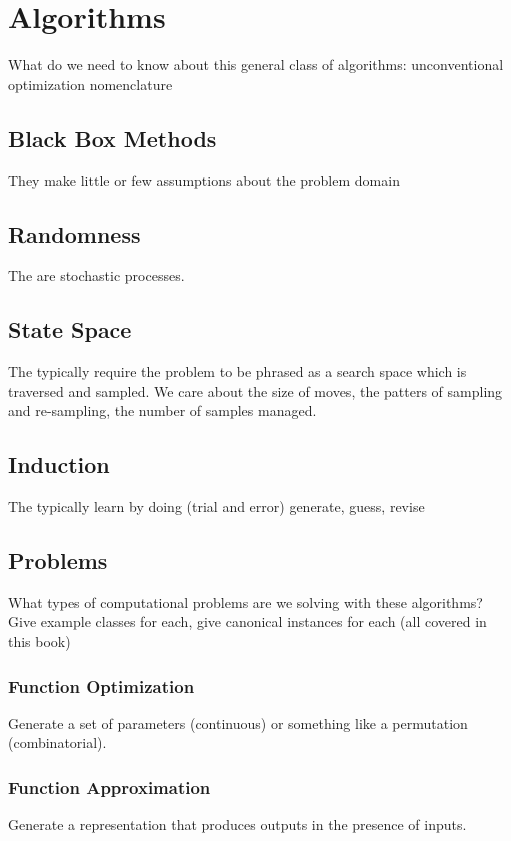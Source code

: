 % 
% 
\section{Algorithms}
\label{intro:sec:algorithms}
What do we need to know about this general class of algorithms: unconventional optimization
nomenclature

\subsection{Black Box Methods}
They make little or few assumptions about the problem domain

\subsection{Randomness}
The are stochastic processes.

\subsection{State Space}
The typically require the problem to be phrased as a search space which is traversed and sampled.
We care about the size of moves, the patters of sampling and re-sampling, the number of samples managed.

\subsection{Induction}
The typically learn by doing (trial and error)
generate, guess, revise

\subsection{Problems}
What types of computational problems are we solving with these algorithms?
Give example classes for each, give canonical instances for each (all covered in this book)

\subsubsection{Function Optimization}
Generate a set of parameters (continuous) or something like a permutation (combinatorial).

\subsubsection{Function Approximation}
Generate a representation that produces outputs in the presence of inputs.



